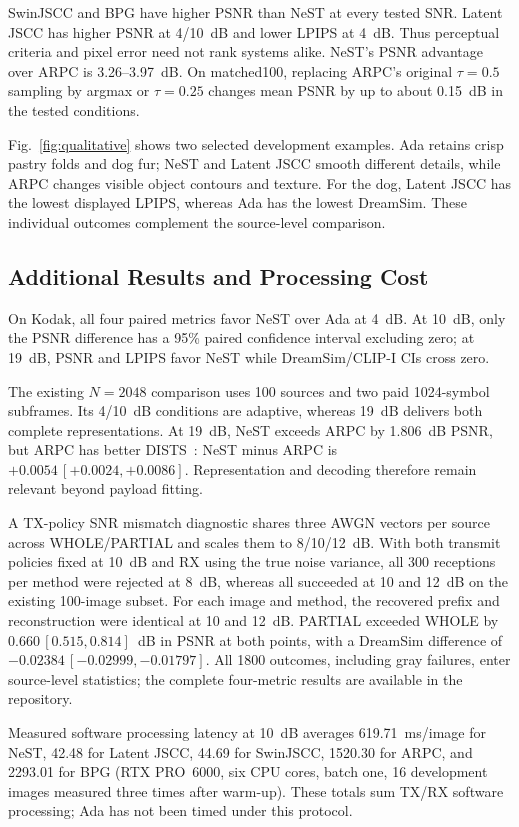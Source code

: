 SwinJSCC and BPG have higher PSNR than NeST at every tested SNR. Latent JSCC has higher PSNR at 4/10~dB and lower LPIPS at 4~dB. Thus perceptual criteria and pixel error need not rank systems alike. NeST's PSNR advantage over ARPC is 3.26--3.97~dB. On matched100, replacing ARPC's original $\tau=0.5$ sampling by argmax or $\tau=0.25$ changes mean PSNR by up to about 0.15~dB in the tested conditions.

Fig.~\ref{fig:qualitative} shows two selected development examples. Ada retains crisp pastry folds and dog fur; NeST and Latent JSCC smooth different details, while ARPC changes visible object contours and texture. For the dog, Latent JSCC has the lowest displayed LPIPS, whereas Ada has the lowest DreamSim. These individual outcomes complement the source-level comparison.

\subsection{Additional Results and Processing Cost}
On Kodak, all four paired metrics favor NeST over Ada at 4~dB. At 10~dB, only the PSNR difference has a 95\% paired confidence interval excluding zero; at 19~dB, PSNR and LPIPS favor NeST while DreamSim/CLIP-I CIs cross zero.

The existing $N=2048$ comparison uses 100 sources and two paid 1024-symbol subframes. Its 4/10~dB conditions are adaptive, whereas 19~dB delivers both complete representations. At 19~dB, NeST exceeds ARPC by 1.806~dB PSNR, but ARPC has better DISTS~\cite{dists}: NeST minus ARPC is $+0.0054\,[+0.0024,+0.0086]$. Representation and decoding therefore remain relevant beyond payload fitting.

A TX-policy SNR mismatch diagnostic shares three AWGN vectors per source across WHOLE/PARTIAL and scales them to 8/10/12~dB. With both transmit policies fixed at 10~dB and RX using the true noise variance, all 300 receptions per method were rejected at 8~dB, whereas all succeeded at 10 and 12~dB on the existing 100-image subset. For each image and method, the recovered prefix and reconstruction were identical at 10 and 12~dB. PARTIAL exceeded WHOLE by $0.660\,[0.515,0.814]$~dB in PSNR at both points, with a DreamSim difference of $-0.02384\,[-0.02999,-0.01797]$. All 1800 outcomes, including gray failures, enter source-level statistics; the complete four-metric results are available in the repository.

Measured software processing latency at 10~dB averages 619.71~ms/image for NeST, 42.48 for Latent JSCC, 44.69 for SwinJSCC, 1520.30 for ARPC, and 2293.01 for BPG (RTX PRO~6000, six CPU cores, batch one, 16 development images measured three times after warm-up). These totals sum TX/RX software processing; Ada has not been timed under this protocol.
